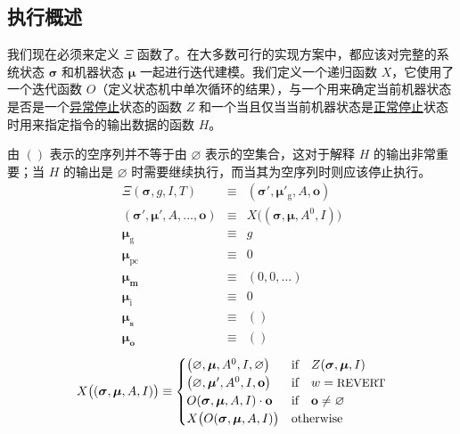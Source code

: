 \documentclass[9pt,oneside]{amsart}
\begin{document}
\begin{multicols}{2}
\subsection{执行概述}

我们现在必须来定义 $\Xi$ 函数了。在大多数可行的实现方案中，都应该对完整的系统状态 $\boldsymbol{\sigma}$ 和机器状态 $\boldsymbol{\mu}$ 一起进行迭代建模。我们定义一个递归函数 $X$，它使用了一个迭代函数 $O$（定义状态机中单次循环的结果），与一个用来确定当前机器状态是否是一个\hyperlink{zhalt}{异常停止}状态的函数 \hyperlink{zhalt}{$Z$} 和一个当且仅当当前机器状态是\hyperlink{hhalt}{正常停止}状态时用来指定指令的输出数据的函数 \hyperlink{hhalt}{$H$}。

\hypertarget{empty_sequence_vs_empty_set}{}由 $()$ 表示的空序列并不等于由 $\varnothing$ 表示的空集合，这对于解释 $H$ 的输出非常重要；当 $H$ 的输出是 $\varnothing$ 时需要继续执行，而当其为空序列时则应该停止执行。
\begin{eqnarray}
\Xi(\boldsymbol{\sigma}, g, I, T) & \equiv & (\boldsymbol{\sigma}'\!, \boldsymbol{\mu}'_{\mathrm{g}}, A, \mathbf{o}) \\
(\boldsymbol{\sigma}', \boldsymbol{\mu}'\!, A, ..., \mathbf{o}) & \equiv & X\big((\boldsymbol{\sigma}, \boldsymbol{\mu}, A^0\!, I)\big) \\
\boldsymbol{\mu}_{\mathrm{g}} & \equiv & g \\
\boldsymbol{\mu}_{\mathrm{pc}} & \equiv & 0 \\
\boldsymbol{\mu}_{\mathbf{m}} & \equiv & (0, 0, ...) \\
\boldsymbol{\mu}_{\mathrm{i}} & \equiv & 0 \\
\boldsymbol{\mu}_{\mathbf{s}} & \equiv & () \\
\boldsymbol{\mu}_{\mathbf{o}} & \equiv & ()
\end{eqnarray}
\begin{equation} \label{eq:X-def}
X\big( (\boldsymbol{\sigma}, \boldsymbol{\mu}, A, I) \big) \equiv \begin{cases}
\big(\varnothing, \boldsymbol{\mu}, A^0, I, \varnothing\big) & \text{if} \quad Z(\boldsymbol{\sigma}, \boldsymbol{\mu}, I) \\
\big(\varnothing, \boldsymbol{\mu}', A^0, I, \mathbf{o}\big) & \text{if} \quad w = \text{\small REVERT} \\
O(\boldsymbol{\sigma}, \boldsymbol{\mu}, A, I) \cdot \mathbf{o} & \text{if} \quad \mathbf{o} \neq \varnothing \\
X\big(O(\boldsymbol{\sigma}, \boldsymbol{\mu}, A, I)\big) & \text{otherwise} \\
\end{cases}
\end{equation}


\end{multicols}
\end{document}
